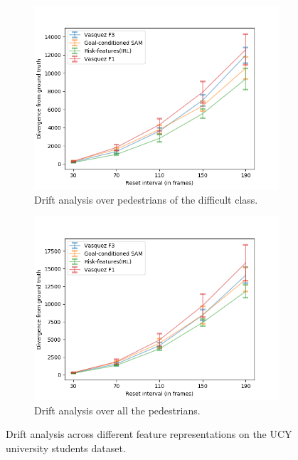 \begin{figure}[htbp]
	\begin{subfigure}{0.5\textwidth}
		\centering
		\includegraphics[width=\linewidth]{plots/ucy_inter_irl_new/drift_hard_ucy_inter_irl.png}
		\caption {Drift analysis over pedestrians of the difficult class.}
		\label{fig:inter_IRL-drift_analysis_hard}
	\end{subfigure}
	\begin{subfigure}{0.5\textwidth}
		\centering
		\includegraphics[width=\linewidth]{plots/ucy_inter_irl_new/drift_all_ucy_inter_irl.png}
		\caption {Drift analysis over all the pedestrians.}
		\label{fig:inter_IRL-drift_analysis_all}
	\end{subfigure}
	\caption{Drift analysis across different feature representations on the UCY university students dataset.}
\end{figure}


